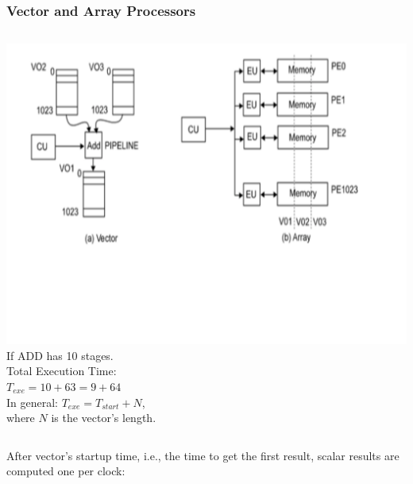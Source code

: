 \documentclass{beamer}
\begin{document}
\begin{frame}[fragile,t]
\frametitle{Vector and Array Processors}

\begin{columns}
\includegraphics[width=59ex]{Ch1Figs/VectorMachine}
If ADD has 10 stages.\\
Total Execution Time:\\
$T_{exe} = 10 + 63 = 9 + 64$\\
In general: $T_{exe} = T_{start}+N$,\\
where $N$ is the vector's length.
\end{columns}
\vspace{-10ex}
After vector's startup time, i.e., the time to get the first result,
scalar results are computed one per clock:\\


\end{frame}
\end{document}
